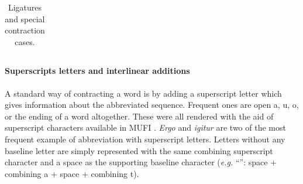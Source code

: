 \documentclass{article}
\newcommand{\juni}[1]{\textsf{\junicodeFont #1}}%
\begin{document}
\begin{table}[H]
{{\begin{tabular}{c|c|c|c|c}
      \end{tabular}
    }}
    \caption{\label{tab:all_lig}Ligatures and special contraction cases.}
\end{table}

\paragraph{Superscripts letters and interlinear additions} A standard way of contracting a word is by adding a superscript letter which gives information about the abbreviated sequence. Frequent ones are open a, u, o, or the ending of a word altogether. These were all rendered with the aid of superscript characters available in MUFI \cite[p. 11]{pinche:hal-03697382}. \textit{Ergo} and \textit{igitur} are two of the most frequent example of abbreviation with superscript letters. Letters without any baseline letter are simply represented with the same combining superscript character and a space as the supporting baseline character (\textit{e.g.}  \enquote{\juni{\symbol{"2007}}}: space + combining a + space + combining t).
\end{document}
